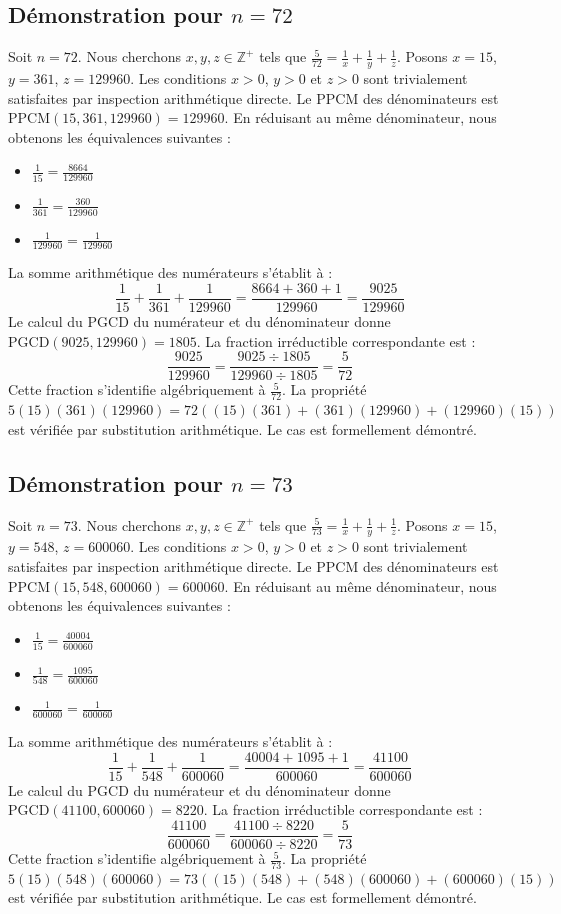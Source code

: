 \documentclass[12pt,a4paper]{article}
\begin{document}
\subsection{Démonstration pour $n = 72$}
Soit $n = 72$. Nous cherchons $x, y, z \in \mathbb{Z}^{+}$ tels que $\frac{5}{72} = \frac{1}{x} + \frac{1}{y} + \frac{1}{z}$.
Posons $x = 15$, $y = 361$, $z = 129960$.
Les conditions $x > 0$, $y > 0$ et $z > 0$ sont trivialement satisfaites par inspection arithmétique directe.
Le PPCM des dénominateurs est $\text{PPCM}(15, 361, 129960) = 129960$.
En réduisant au même dénominateur, nous obtenons les équivalences suivantes :
\begin{itemize}
    \item $\frac{1}{15} = \frac{8664}{129960}$
    \item $\frac{1}{361} = \frac{360}{129960}$
    \item $\frac{1}{129960} = \frac{1}{129960}$
\end{itemize}
La somme arithmétique des numérateurs s'établit à :
$$ \frac{1}{15} + \frac{1}{361} + \frac{1}{129960} = \frac{8664 + 360 + 1}{129960} = \frac{9025}{129960} $$
Le calcul du PGCD du numérateur et du dénominateur donne $\text{PGCD}(9025, 129960) = 1805$.
La fraction irréductible correspondante est :
$$ \frac{9025}{129960} = \frac{9025 \div 1805}{129960 \div 1805} = \frac{5}{72} $$
Cette fraction s'identifie algébriquement à $\frac{5}{72}$.
La propriété $5(15)(361)(129960) = 72((15)(361) + (361)(129960) + (129960)(15))$ est vérifiée par substitution arithmétique.
Le cas est formellement démontré.

\subsection{Démonstration pour $n = 73$}
Soit $n = 73$. Nous cherchons $x, y, z \in \mathbb{Z}^{+}$ tels que $\frac{5}{73} = \frac{1}{x} + \frac{1}{y} + \frac{1}{z}$.
Posons $x = 15$, $y = 548$, $z = 600060$.
Les conditions $x > 0$, $y > 0$ et $z > 0$ sont trivialement satisfaites par inspection arithmétique directe.
Le PPCM des dénominateurs est $\text{PPCM}(15, 548, 600060) = 600060$.
En réduisant au même dénominateur, nous obtenons les équivalences suivantes :
\begin{itemize}
    \item $\frac{1}{15} = \frac{40004}{600060}$
    \item $\frac{1}{548} = \frac{1095}{600060}$
    \item $\frac{1}{600060} = \frac{1}{600060}$
\end{itemize}
La somme arithmétique des numérateurs s'établit à :
$$ \frac{1}{15} + \frac{1}{548} + \frac{1}{600060} = \frac{40004 + 1095 + 1}{600060} = \frac{41100}{600060} $$
Le calcul du PGCD du numérateur et du dénominateur donne $\text{PGCD}(41100, 600060) = 8220$.
La fraction irréductible correspondante est :
$$ \frac{41100}{600060} = \frac{41100 \div 8220}{600060 \div 8220} = \frac{5}{73} $$
Cette fraction s'identifie algébriquement à $\frac{5}{73}$.
La propriété $5(15)(548)(600060) = 73((15)(548) + (548)(600060) + (600060)(15))$ est vérifiée par substitution arithmétique.
Le cas est formellement démontré.
\end{document}
